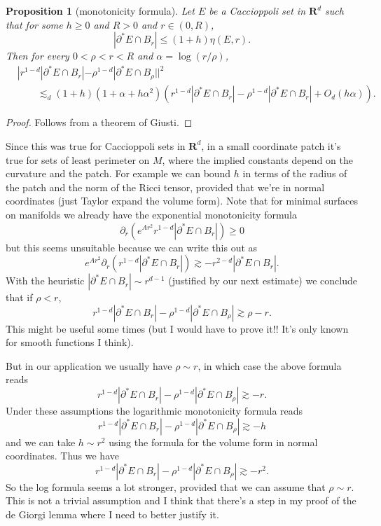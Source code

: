 \documentclass[reqno,12pt,letterpaper]{amsart}
\newcommand{\RR}{\mathbf{R}}
\newtheorem{proposition}[theorem]{Proposition}
\theoremstyle{definition}
\numberwithin{equation}{section}
\begin{document}
\begin{proposition}[monotonicity formula]
Let $E$ be a Caccioppoli set in $\RR^d$ such that for some $h \geq 0$ and $R > 0$ and $r \in (0, R)$,
$$|\partial^* E \cap B_r| \leq (1 + h) \eta(E, r).$$
Then for every $0 < \rho < r < R$ and $\alpha = \log(r/\rho)$,
\begin{align*}
&|r^{1-d} |\partial^* E \cap B_r| - \rho^{1 - d} |\partial^* E \cap B_\rho||^2 \\
&\qquad \lesssim_d (1 + h) (1 + \alpha + h\alpha^2)(r^{1 - d} |\partial^* E \cap B_r| - \rho^{1 - d} |\partial^* E \cap B_r| + O_d(h\alpha)).
\end{align*}
\end{proposition}
\begin{proof}
Follows from a theorem of Giusti.
\end{proof}

Since this was true for Caccioppoli sets in $\RR^d$, in a small coordinate patch it's true for sets of least perimeter on $M$, where the implied constants depend on the curvature and the patch.
For example we can bound $h$ in terms of the radius of the patch and the norm of the Ricci tensor, provided that we're in normal coordinates (just Taylor expand the volume form).
Note that for minimal surfaces on manifolds we already have the exponential monotonicity formula
$$\partial_r(e^{Ar^2}r^{1-d} |\partial^* E \cap B_r|) \geq 0$$
but this seems unsuitable because we can write this out as
$$e^{Ar^2}\partial_r (r^{1-d}|\partial^* E \cap B_r|) \gtrsim -r^{2-d} |\partial^* E \cap B_r|.$$
With the heuristic $|\partial^* E \cap B_r| \sim r^{d - 1}$ (justified by our next estimate) we conclude that if $\rho < r$,
$$r^{1-d}|\partial^* E \cap B_r| - \rho^{1 - d}|\partial^* E \cap B_\rho| \gtrsim \rho-r.$$
This might be useful some times (but I would have to prove it!! It's only known for smooth functions I think).

But in our application we usually have $\rho \sim r$, in which case the above formula reads
$$r^{1-d}|\partial^* E \cap B_r| - \rho^{1 - d}|\partial^* E \cap B_\rho| \gtrsim -r.$$
Under these assumptions the logarithmic monotonicity formula reads
$$r^{1-d}|\partial^* E \cap B_r| - \rho^{1 - d}|\partial^* E \cap B_\rho| \gtrsim -h$$
and we can take $h \sim r^2$ using the formula for the volume form in normal coordinates.
Thus we have
$$r^{1-d}|\partial^* E \cap B_r| - \rho^{1 - d}|\partial^* E \cap B_\rho| \gtrsim -r^2.$$
So the log formula seems a lot stronger, provided that we can assume that $\rho \sim r$.
This is not a trivial assumption and I think that there's a step in my proof of the de Giorgi lemma where I need to better justify it.
\end{document}
